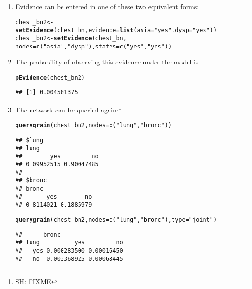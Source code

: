 \documentclass[10pt]{article}\usepackage[]{graphicx}\usepackage[]{color}
\makeatletter
\newcommand{\hlstr}[1]{\textcolor[rgb]{0.192,0.494,0.8}{#1}}%
\newcommand{\hlstd}[1]{\textcolor[rgb]{0.345,0.345,0.345}{#1}}%
\newcommand{\hlkwb}[1]{\textcolor[rgb]{0.69,0.353,0.396}{#1}}%
\newcommand{\hlkwc}[1]{\textcolor[rgb]{0.333,0.667,0.333}{#1}}%
\newcommand{\hlkwd}[1]{\textcolor[rgb]{0.737,0.353,0.396}{\textbf{#1}}}%
\newenvironment{kframe}{%
 \def\at@end@of@kframe{}%
 \ifinner\ifhmode%
  \def\at@end@of@kframe{\end{minipage}}%
  \begin{minipage}{\columnwidth}%
 \fi\fi%
 \def\FrameCommand##1{\hskip\@totalleftmargin \hskip-\fboxsep
 \colorbox{shadecolor}{##1}\hskip-\fboxsep
     \hskip-\linewidth \hskip-\@totalleftmargin \hskip\columnwidth}%
 \MakeFramed {\advance\hsize-\width
   \@totalleftmargin\z@ \linewidth\hsize
   \@setminipage}}%
 {\par\unskip\endMakeFramed%
 \at@end@of@kframe}
\newenvironment{knitrout}{}{} %
\makeatother
\begin{document}
\begin{enumerate}
\item Evidence can be entered in one of these two equivalent forms:

\begin{knitrout}
\color{fgcolor}\begin{kframe}
\begin{alltt}
\hlstd{chest_bn2}  \hlkwb{<-} \hlkwd{setEvidence}\hlstd{(chest_bn,} \hlkwc{evidence}\hlstd{=}\hlkwd{list}\hlstd{(}\hlkwc{asia}\hlstd{=}\hlstr{"yes"}\hlstd{,} \hlkwc{dysp}\hlstd{=}\hlstr{"yes"}\hlstd{))}
\hlstd{chest_bn2}  \hlkwb{<-} \hlkwd{setEvidence}\hlstd{(chest_bn,}
                      \hlkwc{nodes}\hlstd{=}\hlkwd{c}\hlstd{(}\hlstr{"asia"}\hlstd{,} \hlstr{"dysp"}\hlstd{),} \hlkwc{states}\hlstd{=}\hlkwd{c}\hlstd{(}\hlstr{"yes"}\hlstd{,} \hlstr{"yes"}\hlstd{))}
\end{alltt}
\end{kframe}
\end{knitrout}

\item The probability of observing this evidence under the model is
\begin{knitrout}
\color{fgcolor}\begin{kframe}
\begin{alltt}
\hlkwd{pEvidence}\hlstd{(chest_bn2)}
\end{alltt}
\begin{verbatim}
## [1] 0.004501375
\end{verbatim}
\end{kframe}
\end{knitrout}

\item The network can be queried again:\footnote{SH: FIXME}
\begin{knitrout}
\color{fgcolor}\begin{kframe}
\begin{alltt}
\hlkwd{querygrain}\hlstd{(chest_bn2,} \hlkwc{nodes}\hlstd{=}\hlkwd{c}\hlstd{(}\hlstr{"lung"}\hlstd{,} \hlstr{"bronc"}\hlstd{))}
\end{alltt}
\begin{verbatim}
## $lung
## lung
##        yes         no 
## 0.09952515 0.90047485 
## 
## $bronc
## bronc
##       yes        no 
## 0.8114021 0.1885979
\end{verbatim}
\begin{alltt}
\hlkwd{querygrain}\hlstd{(chest_bn2,} \hlkwc{nodes}\hlstd{=}\hlkwd{c}\hlstd{(}\hlstr{"lung"}\hlstd{,} \hlstr{"bronc"}\hlstd{),} \hlkwc{type}\hlstd{=}\hlstr{"joint"}\hlstd{)}
\end{alltt}
\begin{verbatim}
##      bronc
## lung          yes         no
##   yes 0.000283500 0.00016450
##   no  0.003368925 0.00068445
\end{verbatim}
\end{kframe}
\end{knitrout}
\end{enumerate}
\end{document}
